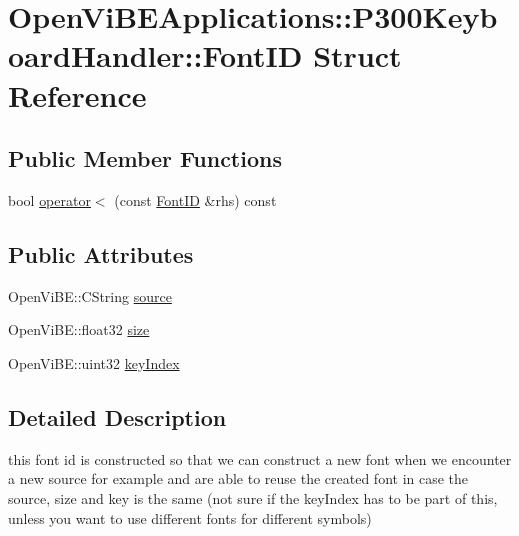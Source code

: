 \hypertarget{structOpenViBEApplications_1_1P300KeyboardHandler_1_1FontID}{
\section{OpenViBEApplications::P300KeyboardHandler::FontID Struct Reference}
\label{structOpenViBEApplications_1_1P300KeyboardHandler_1_1FontID}
}
\subsection*{Public Member Functions}
\begin{DoxyCompactItemize}
\item 
bool \hyperlink{structOpenViBEApplications_1_1P300KeyboardHandler_1_1FontID_afc40adb760456cd8a3b1da967a5b68fe}{operator$<$} (const \hyperlink{structOpenViBEApplications_1_1P300KeyboardHandler_1_1FontID}{FontID} \&rhs) const 
\end{DoxyCompactItemize}
\subsection*{Public Attributes}
\begin{DoxyCompactItemize}
\item 
OpenViBE::CString \hyperlink{structOpenViBEApplications_1_1P300KeyboardHandler_1_1FontID_a2ccf859aff3d731b45026efc1a589205}{source}
\item 
OpenViBE::float32 \hyperlink{structOpenViBEApplications_1_1P300KeyboardHandler_1_1FontID_aa4db670dc99b46c0dcb33a9ee14052cc}{size}
\item 
OpenViBE::uint32 \hyperlink{structOpenViBEApplications_1_1P300KeyboardHandler_1_1FontID_afc7bea46e01749afed3b58f73a9eef72}{keyIndex}
\end{DoxyCompactItemize}


\subsection{Detailed Description}
this font id is constructed so that we can construct a new font when we encounter a new source for example and are able to reuse the created font in case the source, size and key is the same (not sure if the keyIndex has to be part of this, unless you want to use different fonts for different symbols) 

